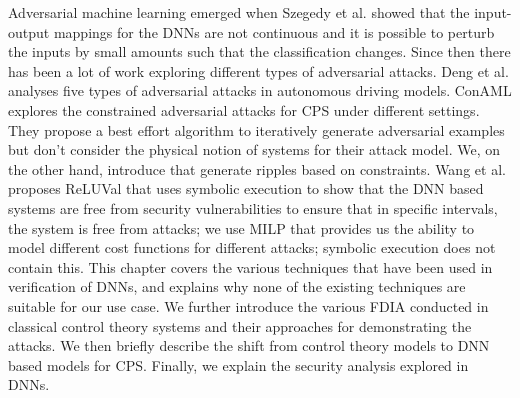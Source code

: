 Adversarial machine learning emerged when Szegedy et al.  \cite{Szegedy2013IntriguingPO} showed that the input-output mappings for the \ac{DNN}s are not continuous and it is possible to perturb the inputs by small amounts such that the classification changes. 
Since then there has been a lot of work exploring different types of adversarial attacks. Deng et al. \cite{deng2020analysis} analyses five types of adversarial attacks in autonomous driving models. 
ConAML \cite{li2020conaml} explores the constrained adversarial attacks for \ac{CPS} under different settings. They propose a best effort algorithm to iteratively generate adversarial examples but don't consider the physical notion of systems for their attack model. We, on the other hand, introduce \attack  that generate ripples based on constraints. 
Wang et al. \cite{217595} proposes ReLUVal that uses symbolic execution to show that the DNN based systems are free from security vulnerabilities to ensure that in specific intervals, the system is free from attacks; we use MILP that provides us the ability to model different cost functions for different attacks; symbolic execution does not contain this. 
\newline 
\newline 
This chapter covers the various techniques that have been used in verification of DNNs, and explains why none of the existing techniques are suitable for our use case. 
We further introduce the various \ac{FDIA} conducted in classical control theory systems and their approaches for demonstrating the attacks. 
We then briefly describe the shift from control theory models to \ac{DNN} based models for \ac{CPS}.
Finally, we explain the security analysis explored in \ac{DNN}s. 